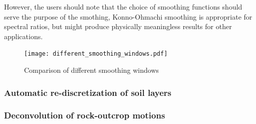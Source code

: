 \documentclass[11pt,letterpaper]{article}
\begin{document}
However, the users should note that the choice of smoothing functions should serve the purpose of the smothing, Konno-Ohmachi smoothing is appropriate for spectral ratios, but might produce physically meaningless results for other applications.

\begin{figure}[h]
   \centering
  \texttt{[image: different\_smoothing\_windows.pdf]}\\
  \caption{Comparison of different smoothing windows}\label{fig:different_smoothing_windows}
\end{figure}




\subsubsection{Automatic re-discretization of soil layers}\label{sec:rediscretization}




\subsubsection{Deconvolution of rock-outcrop motions}\label{sec:deconvolution}
\end{document}
